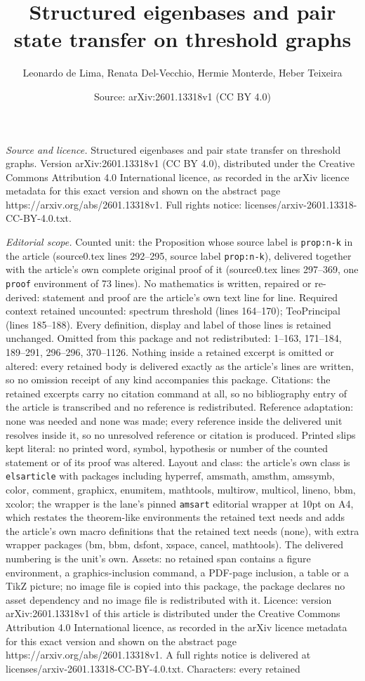 \documentclass[10pt,a4paper]{amsart}
\title[Structured eigenbases and pair state transfer on threshold g]{Structured eigenbases and pair state transfer on threshold graphs}
\author{Leonardo de Lima, Renata Del-Vecchio, Hermie Monterde, Heber Teixeira}
\date{Source: arXiv:2601.13318v1 (CC BY 4.0)}
\begin{document}
\maketitle

\noindent\emph{Source and licence.} Structured eigenbases and pair state transfer on threshold graphs. Version arXiv:2601.13318v1 (CC BY 4.0), distributed under the Creative Commons Attribution 4.0 International licence, as recorded in the arXiv licence metadata for this exact version and shown on the abstract page https://arxiv.org/abs/2601.13318v1. Full rights notice: licenses/arxiv-2601.13318-CC-BY-4.0.txt.\par\smallskip

\noindent\textit{Editorial scope.} Counted unit: the Proposition whose source label is \texttt{prop:n-k} in the article (source0.tex lines 292--295, source label \texttt{prop:n-k}), delivered together with the article's own complete original proof of it (source0.tex lines 297--369, one \texttt{proof} environment of 73 lines). No mathematics is written, repaired or re-derived: statement and proof are the article's own text line for line. Required context retained uncounted: spectrum  threshold (lines 164--170); TeoPrincipal (lines 185--188). Every definition, display and label of those lines is retained unchanged. Omitted from this package and not redistributed: 1--163, 171--184, 189--291, 296--296, 370--1126. Nothing inside a retained excerpt is omitted or altered: every retained body is delivered exactly as the article's lines are written, so no omission receipt of any kind accompanies this package. Citations: the retained excerpts carry no citation command at all, so no bibliography entry of the article is transcribed and no reference is redistributed. Reference adaptation: none was needed and none was made; every reference inside the delivered unit resolves inside it, so no unresolved reference or citation is produced. Printed slips kept literal: no printed word, symbol, hypothesis or number of the counted statement or of its proof was altered. Layout and class: the article's own class is \texttt{elsarticle} with packages including hyperref, amsmath, amsthm, amssymb, color, comment, graphicx, enumitem, mathtools, multirow, multicol, lineno, bbm, xcolor; the wrapper is the lane's pinned \texttt{amsart} editorial wrapper at 10pt on A4, which restates the theorem-like environments the retained text needs and adds the article's own macro definitions that the retained text needs (none), with extra wrapper packages (bm, bbm, dsfont, xspace, cancel, mathtools). The delivered numbering is the unit's own. Assets: no retained span contains a figure environment, a graphics-inclusion command, a PDF-page inclusion, a table or a TikZ picture; no image file is copied into this package, the package declares no asset dependency and no image file is redistributed with it. Licence: version arXiv:2601.13318v1 of this article is distributed under the Creative Commons Attribution 4.0 International licence, as recorded in the arXiv licence metadata for this exact version and shown on the abstract page https://arxiv.org/abs/2601.13318v1. A full rights notice is delivered at licenses/arxiv-2601.13318-CC-BY-4.0.txt. Characters: every retained 
\end{document}

